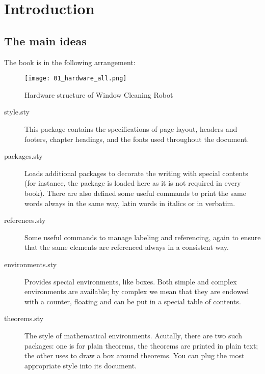 \setchapterpreamble[u]{\margintoc}
\chapter{Introduction}

\section{The main ideas}
The book is in the following arrangement:
\begin{figure*}[h!]
	\texttt{[image: 01\_hardware\_all.png]}
	\caption[Hardware structure]{Hardware structure of Window Cleaning Robot}
\end{figure*}


\begin{description}
	\item[style.sty] This package contains the specifications of page 
	layout, headers and footers, chapter headings, and the fonts used 
	throughout the document.
	\item[packages.sty] Loads additional packages to decorate the 
	writing with special contents (for instance, the  
	package is loaded here as it is not required in every book). There 
	are also defined some useful commands to print the same words always 
	in the same way, \eg latin words in italics or  in 
	verbatim.
	\item[references.sty] Some useful commands to manage labeling and 
	referencing, again to ensure that the same elements are referenced 
	always in a consistent way.
	\item[environments.sty] Provides special environments, like boxes. 
	Both simple and complex environments are available; by complex we 
	mean that they are endowed with a counter, floating and can be put 
	in a special table of contents.
	\item[theorems.sty] The style of mathematical environments. 
	Acutally, there are two such packages: one is for plain theorems, 
	\ie the theorems are printed in plain text; the other uses 
	 to draw a box around theorems. You can plug the 
	most appropriate style into its document.
\end{description}

